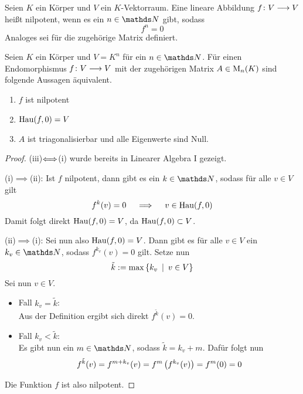 		\begin{definition}
			Seien $K$ ein Körper und $V$ ein $K$-Vektorraum.
			Eine lineare Abbildung $f\colon V\longrightarrow V$ heißt nilpotent, wenn es ein $n\in\SN$ gibt, sodass
			\[ f^n = 0 \]
			Analoges sei für die zugehörige Matrix definiert.
		\end{definition}

		\begin{theorem}
			Seien $K$ ein Körper und $V=K^n$ für ein $n\in\SN$.
			Für einen Endomorphismus $f\colon V\longrightarrow V$ mit der zugehörigen Matrix $A\in\mathrm{M}_n(K)$ sind folgende Aussagen äquivalent.
			\begin{enumerate}[label=\normalfont(\roman*)]
				\item $f$ ist nilpotent
				\item $\mathrm{Hau}(f,0)=V$
				\item $A$ ist triagonalisierbar und alle Eigenwerte sind Null.
			\end{enumerate}
		\end{theorem}
		\begin{proof}
			(iii)$\Longleftrightarrow$(i) wurde bereits in Linearer Algebra I gezeigt.

			(i)$\implies$(ii):
			Ist $f$ nilpotent, dann gibt es ein $k\in\SN$, sodass für alle $v\in V$ gilt
			\[ f^k(v)=0 \quad \implies \quad v\in\mathrm{Hau}(f,0) \]
			Damit folgt direkt $\mathrm{Hau}(f,0) = V$, da $\mathrm{Hau}(f,0)\subset V$.

			(ii)$\implies$(i):
			Sei nun also $\mathrm{Hau}(f,0)=V$.
			Dann gibt es für alle $v\in V$ ein $k_v\in\SN$, sodass $f^{k_v}(v)=0$ gilt.
			Setze nun
			\[ \tilde{k} := \max\left\{ k_v \enspace \middle\vert \enspace v\in V \right\} \]
			Sei nun $v\in V$.
			\begin{itemize}
				\item Fall $k_v=\tilde{k}$:\\
					Aus der Definition ergibt sich direkt $f^{\tilde{k}}(v) = 0$.
				\item Fall $k_v<\tilde{k}$:\\
					Es gibt nun ein $m\in\SN$, sodass $\tilde{k}=k_v+m$.
					Dafür folgt nun
					\[ f^{\tilde{k}}(v) = f^{m+k_v}(v) = f^m\left(  f^{k_v}(v)  \right) = f^m(0) = 0 \]
			\end{itemize}
			Die Funktion $f$ ist also nilpotent.
		\end{proof}

